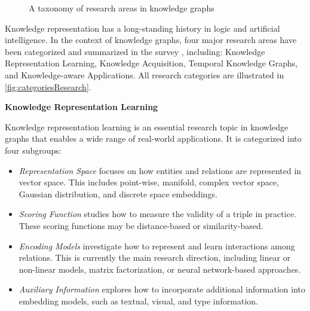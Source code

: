 \begin{figure}[htp]
{{
}}
	\caption{
		A taxonomy of research areas in knowledge graphs}
	\label{fig:categoriesResearch}
\end{figure}


Knowledge representation has a long-standing history in logic and artificial intelligence. In the context of knowledge graphs, four major research areas have been categorized and summarized in the survey \cite{ji2020survey}, including: Knowledge Representation Learning, Knowledge Acquisition, Temporal Knowledge Graphs, and Knowledge-aware Applications. All research categories are illustrated in \autoref{fig:categoriesResearch}.

\textbf{Knowledge Representation Learning}

Knowledge representation learning is an essential research topic in knowledge graphs that enables a wide range of real-world applications. It is categorized into four subgroups:

\begin{itemize}
	\item \textit{Representation Space} focuses on how entities and relations are represented in vector space. This includes point-wise, manifold, complex vector space, Gaussian distribution, and discrete space embeddings.
	
	\item \textit{Scoring Function} studies how to measure the validity of a triple in practice. These scoring functions may be distance-based or similarity-based.
	
	\item \textit{Encoding Models} investigate how to represent and learn interactions among relations. This is currently the main research direction, including linear or non-linear models, matrix factorization, or neural network-based approaches.
	
	\item \textit{Auxiliary Information} explores how to incorporate additional information into embedding models, such as textual, visual, and type information.
\end{itemize}

